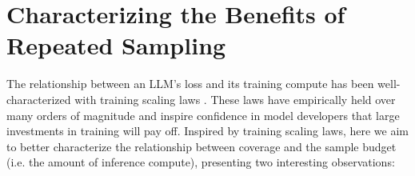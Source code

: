 \documentclass[11pt]{article}
\begin{document}
\begin{table}
\centering
{}
\caption{Comparing API cost (in US dollars) and performance for various models on the SWE-bench Lite dataset using the Moatless Tools agent framework. When sampled more, the open-source DeepSeek-Coder-V2-Instruct model can achieve the same issue solve-rate as closed-source frontier models for under a third of the price.}
\label{tab:case_study}
\end{table}


\section{Characterizing the Benefits of Repeated Sampling}
\label{sec:characterize}


The relationship between an LLM’s loss and its training compute has been well-characterized with training scaling laws \cite{hestness2017deeplearningscalingpredictable, kaplan2020scaling, hoffmann2022trainingcomputeoptimallargelanguage}. 
These laws have empirically held over many orders of magnitude and inspire confidence in model developers that large investments in training will pay off. 
Inspired by training scaling laws, here we aim to better characterize the relationship between coverage and the sample budget (i.e. the amount of inference compute), presenting two interesting observations:
\end{document}
